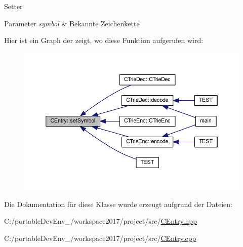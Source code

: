 Setter 
\begin{DoxyParams}{Parameter}
{\em symbol} & Bekannte Zeichenkette \\
\hline
\end{DoxyParams}
Hier ist ein Graph der zeigt, wo diese Funktion aufgerufen wird\+:
\nopagebreak
\begin{figure}[H]
\begin{center}
\leavevmode
\includegraphics[width=350pt]{class_c_entry_a2ac2cbee24817ff5b67e09f03a952e77_icgraph}
\end{center}
\end{figure}


Die Dokumentation für diese Klasse wurde erzeugt aufgrund der Dateien\+:\begin{DoxyCompactItemize}
\item 
C\+:/portable\+Dev\+Env\+\_/workspace2017/project/src/\hyperlink{_c_entry_8hpp}{C\+Entry.\+hpp}\item 
C\+:/portable\+Dev\+Env\+\_/workspace2017/project/src/\hyperlink{_c_entry_8cpp}{C\+Entry.\+cpp}\end{DoxyCompactItemize}
